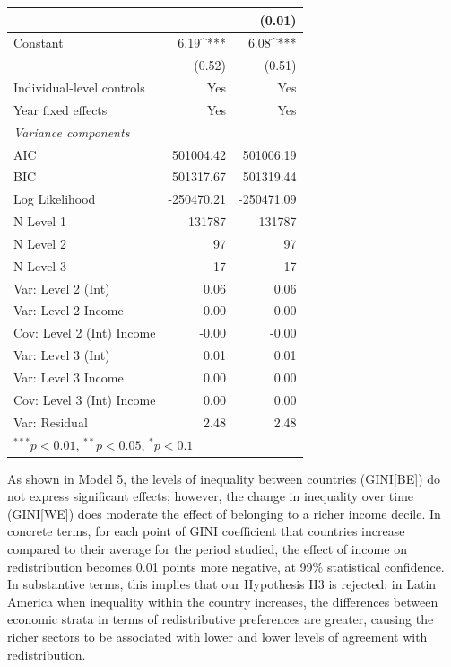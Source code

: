 \documentclass[utf8]{frontiersSCNS} %
\begin{document}
\begin{table}
\begin{tabular}{l D{.}{.}{7.5} D{.}{.}{7.5} }
                                    &             & (0.01)      \\
\hline
Constant                            & 6.19^{***}  & 6.08^{***}  \\
                                    & (0.52)      & (0.51)      \\
\hline
Individual-level controls           &     Yes     &     Yes     \\
Year fixed effects                  &     Yes     &     Yes     \\
\hline
\textit{Variance components}        &             &             \\
AIC                                 & 501004.42   & 501006.19   \\
BIC                                 & 501317.67   & 501319.44   \\
Log Likelihood                      & -250470.21  & -250471.09  \\
N Level 1                           & 131787      & 131787      \\
N Level 2                           & 97          & 97          \\
N Level 3                           & 17          & 17          \\
Var: Level 2 (Int)                  & 0.06        & 0.06        \\
Var: Level 2 Income                 & 0.00        & 0.00        \\
Cov: Level 2 (Int) Income           & -0.00       & -0.00       \\
Var: Level 3 (Int)                  & 0.01        & 0.01        \\
Var: Level 3 Income                 & 0.00        & 0.00        \\
Cov: Level 3 (Int) Income           & 0.00        & 0.00        \\
Var: Residual                       & 2.48        & 2.48        \\
\bottomrule
{}
\end{tabular}
\end{table}

As shown in Model 5, the levels of inequality between countries (GINI[BE]) do not express significant effects; however, the change in inequality over time (GINI[WE]) does moderate the effect of belonging to a richer income decile. In concrete terms, for each point of GINI coefficient that countries increase compared to their average for the period studied, the effect of income on redistribution becomes 0.01 points more negative, at 99\% statistical confidence. In substantive terms, this implies that our Hypothesis H3 is rejected: in Latin America when inequality within the country increases, the differences between economic strata in terms of redistributive preferences are greater, causing the richer sectors to be associated with lower and lower levels of agreement with redistribution.
\end{document}
